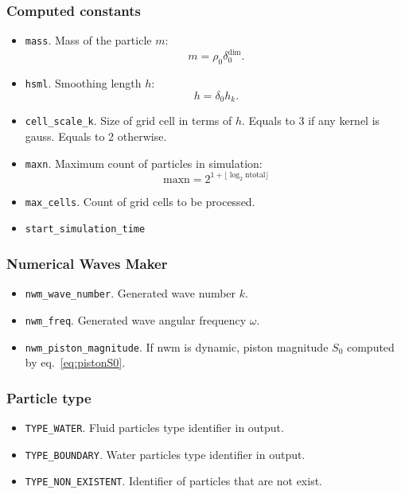 \subsubsection{Computed constants}
\begin{itemize}
    \item \verb|mass|. Mass of the particle $m$:
    \begin{equation}
        m = \rho_{0} \delta_{0}^{\text{dim}}.
    \end{equation}

    \item \verb|hsml|. Smoothing length $h$:
    \begin{equation}
        h = \delta_{0} h_{k}.
    \end{equation}

    \item \verb|cell_scale_k|. Size of grid cell in terms of $h$. Equals to 3 if any kernel is gauss. Equals to 2 otherwise.

    \item \verb|maxn|. Maximum count of particles in simulation:
    \begin{equation}
        \text{maxn} = 2^{1 + 
        \lfloor\log_{2}\text{ntotal}\rfloor}
    \end{equation}

    \item \verb|max_cells|. Count of grid cells to be processed.

    \item \verb|start_simulation_time|
\end{itemize}

\subsubsection{Numerical Waves Maker}
\begin{itemize}
    \item \verb|nwm_wave_number|. Generated wave number $k$.
    \item \verb|nwm_freq|. Generated wave angular frequency $\omega$.
    \item \verb|nwm_piston_magnitude|. If nwm is dynamic, piston magnitude $S_{0}$ computed by eq.~\ref{eq:pistonS0}.
\end{itemize}

\subsubsection{Particle type}\label{sec:parttype}
\begin{itemize}
    \item \verb|TYPE_WATER|. Fluid particles type identifier in output.
    \item \verb|TYPE_BOUNDARY|. Water particles type identifier in output.
    \item \verb|TYPE_NON_EXISTENT|. Identifier of particles that are not exist.
\end{itemize}